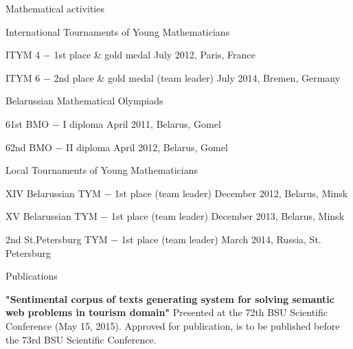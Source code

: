 \documentclass{resume} %
\begin{document}
\begin{rSection}{Mathematical activities}

\begin{rSubsection}{International Tournaments of Young Mathematicians}{}{}

\item ITYM 4 $-$ 1st place \& gold medal \hfill July 2012, Paris, France
\item ITYM 6 $-$ 2nd place \& gold medal (team leader) \hfill July 2014, Bremen, Germany

\end{rSubsection}

\begin{rSubsection}{Belarussian Mathematical Olympiads}{}{}

\item 61st BMO $-$ I diploma \hfill  April 2011, Belarus, Gomel
\item 62nd BMO $-$ II diploma \hfill April 2012, Belarus, Gomel
\end{rSubsection}


\begin{rSubsection}{Local Tournaments of Young Mathematicians}{}{}

\item XIV Belarussian TYM $-$ 1st place (team leader) \hfill December 2012, Belarus, Minsk
\item XV Belarussian TYM $-$ 1st place (team leader) \hfill December 2013, Belarus, Minsk
\item 2nd St.Petersburg TYM $-$ 1st place (team leader) \hfill March 2014, Russia, St. Petersburg
\end{rSubsection}

\end{rSection}

\begin{rSection}{Publications}

{\bf "Sentimental corpus of texts generating system for solving semantic web problems in tourism domain"}
Presented at the 72th BSU Scientific Conference (May 15, 2015). Approved for publication, is to be published before the 73rd BSU Scientific Conference.

\end{rSection}






\end{document}
